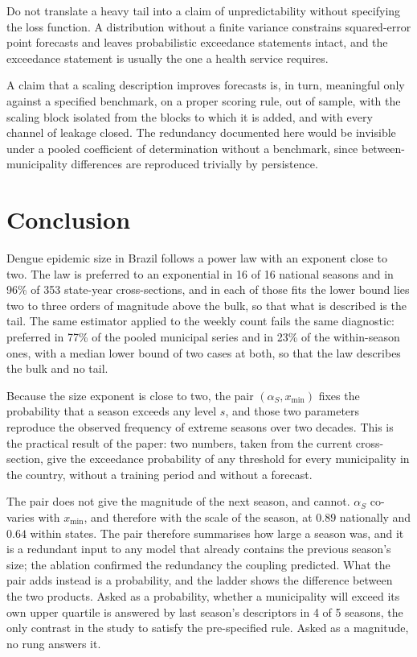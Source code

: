 \documentclass[english,10pt,b5paper]{article}
\begin{document}
Do not translate a heavy tail into a claim of unpredictability without
specifying the loss function. A distribution without a finite variance constrains
squared-error point forecasts and leaves probabilistic exceedance statements
intact, and the exceedance statement is usually the one a health service requires.

A claim that a scaling description improves forecasts is, in turn, meaningful only
against a specified benchmark, on a proper scoring rule, out of sample, with the
scaling block isolated from the blocks to which it is added, and with every channel
of leakage closed. The redundancy documented here would be invisible under a pooled
coefficient of determination without a benchmark, since between-municipality
differences are reproduced trivially by persistence.

\section{Conclusion}

Dengue epidemic size in Brazil follows a power law with an exponent close to two.
The law is preferred to an exponential in 16 of 16 national seasons and in 96\%
of 353 state-year cross-sections, and in each of those fits the lower bound lies
two to three orders of magnitude above the bulk, so that what is described is the
tail. The same estimator applied to the weekly count fails the same diagnostic:
preferred in 77\% of the pooled municipal series and in 23\% of the within-season
ones, with a median lower bound of two cases at both, so that the law describes the
bulk and no tail.

Because the size exponent is close to two, the pair $(\alpha_S, x_{\min})$ fixes
the probability that a season exceeds any level $s$, and those two parameters
reproduce the observed frequency of extreme seasons over two decades. This is the
practical result of the paper: two numbers, taken from the current cross-section,
give the exceedance probability of any threshold for every municipality in the
country, without a training period and without a forecast.

The pair does not give the magnitude of the next season, and cannot.
$\alpha_S$ co-varies with $x_{\min}$, and therefore with the scale of the
season, at $0.89$ nationally and $0.64$ within states. The pair therefore
summarises how large a season was, and it is a redundant input to any model
that already contains the previous season's size; the ablation confirmed the
redundancy the coupling predicted. What the pair adds instead is a
probability, and the ladder shows the difference between the two products.
Asked as a probability, whether a municipality will exceed its own upper
quartile is answered by last season's descriptors in 4 of 5 seasons, the only
contrast in the study to satisfy the pre-specified rule. Asked as a magnitude,
no rung answers it.
\end{document}
